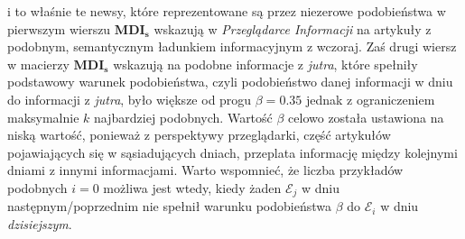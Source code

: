i to właśnie te newsy, które reprezentowane są przez  niezerowe podobieństwa w pierwszym wierszu 
$\mathbf{MDI_s}$ wskazują w \textit{Przeglądarce Informacji} na artykuły z podobnym, semantycznym ładunkiem
informacyjnym z wczoraj. Zaś drugi wiersz w macierzy $\mathbf{MDI_s}$ wskazują na podobne informacje 
z \textit{jutra}, które spełniły podstawowy warunek podobieństwa, czyli podobieństwo danej informacji 
w dniu do informacji z \textit{jutra}, było większe od progu $\beta = 0.35$ jednak z ograniczeniem 
maksymalnie $k$ najbardziej podobnych. Wartość $\beta$ celowo została ustawiona na niską wartość, 
ponieważ z perspektywy przeglądarki, część artykułów pojawiających się w sąsiadujących dniach, 
przeplata informację między kolejnymi dniami z innymi informacjami. Warto wspomnieć, że liczba przykładów
podobnych $i=0$ możliwa jest wtedy, kiedy żaden $\mathcal{E}_{j}$ w dniu następnym/poprzednim nie spełnił
warunku podobieństwa $\beta$ do $\mathcal{E}_{i}$ w dniu \textit{dzisiejszym}.

